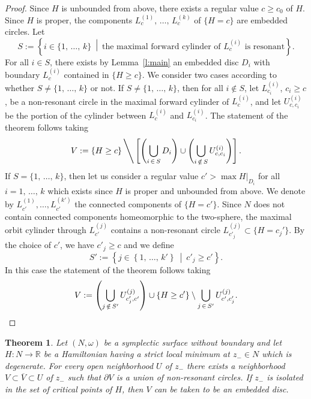 \documentclass[10pt]{amsart}
\newtheorem{theo}[cdrthm]{Theorem}
\theoremstyle{definition}
\newcommand{\R}{\mathbb{R}}
\newcommand{\p}{\partial}
\begin{document}
\begin{proof}
Since $H$ is unbounded from above, there exists a regular value $c\geq c_0$ of $H$. Since $H$ is proper, the components $L_c^{(1)},\,\ldots,\,L_c^{(k)}$ of $\{H=c\}$ are embedded circles. Let
\[
S:=\left\{i\in \{1,\,\ldots,\,k\}\ \middle|\ \text{the maximal forward cylinder of $L_c^{(i)}$ is resonant}\right\}.
\]
For all $i\in S$, there exists by Lemma~\ref{l:main} an embedded disc $D_i$ with boundary $L_c^{(i)}$ contained in $\{H\geq c\}$. We consider two cases according to whether $S\neq\{1,\,\ldots,\,k\}$ or not. If $S\neq\{1,\,\ldots,\,k\}$, then for all $i\notin S$, let $L_{c_i}^{(i)}$, $c_i\geq c$, be a non-resonant circle in the maximal forward cylinder of $L_c^{(i)}$, and let $U_{c,c_i}^{(i)}$ be the portion of the cylinder between $L_c^{(i)}$ and $L_{c_i}^{(i)}$. The statement of the theorem follows taking
\begin{equation*}
V:=\left\{H\geq c\right\}\Bigg\backslash\left[\left(\bigcup_{i\,\in\,S}D_i\right)\cup\left(\bigcup_{i\,\notin\,S}U_{c,c_i}^{(i)}\right)\right].
\end{equation*}
If $S=\{1,\,\ldots,\,k\}$, then let us consider a regular value $c'> \max H|_{D_i}$ for all $i=1,\,\ldots,\,k$ which exists since $H$ is proper and unbounded from above. We denote by $L_{c'}^{(1)},\ldots,L_{c'}^{(k')}$ the connected components of $\{H=c'\}$. Since $N$ does not contain connected components homeomorphic to the two-sphere, the maximal orbit cylinder through $L_{c'}^{(j)}$ contains a non-resonant circle $L_{c'_j}^{(j)}\subset\{H=c_j'\}$. By the choice of $c'$, we have $c'_j\geq c$ and we define 
\[
S':=\left\{j\in \left\{1,\,\ldots,\,k'\right\}\ \middle|\ c'_j\geq c'\right\}.
\]
In this case the statement of the theorem follows taking
\[
V:=\left(\bigcup_{j\,\notin\,S'}U_{c'_j,c'}^{(j)}\right)\cup\left\{H\geq c'\right\}\setminus\bigcup_{j\,\in\,S'}U_{c',c'_j}^{(j)}.\qedhere
\]
\end{proof}

\begin{theo}\label{t:z-}
Let $(N,\omega)$ be a symplectic surface without boundary and let $H:N\to\R$ be a Hamiltonian having a strict local minimum at $z_-\in N$ which is degenerate. For every open neighborhood $U$ of $z_-$ there exists a neighborhood $V\subset \overline V \subset U$ of $z_-$ such that $\p V$ is a union of non-resonant circles. If $z_-$ is isolated in the set of critical points of $H$, then $V$ can be taken to be an embedded disc.
\end{theo}
\end{document}
